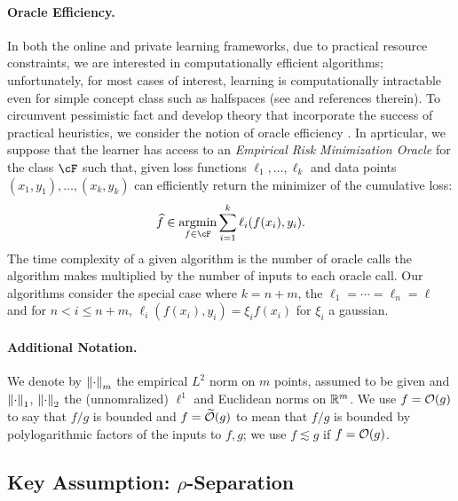 \paragraph{Oracle Efficiency.}
    In both the online and private learning frameworks, due to practical resource constraints, we are interested in computationally efficient algorithms; unfortunately, for most cases of interest, learning is computationally intractable even for simple concept class such as halfspaces (see \citep{tiegel2022hardness} and references therein).
    To circumvent pessimistic fact and  develop theory that incorporate the success of practical heuristics, we consider the notion of oracle efficiency \citep{kalai2005efficient}.  In aprticular, we suppose that the learner has access to an \emph{Empirical Risk Minimization Oracle} for the class $\cF$ such that, given loss functions $\ell_1, \dots, \ell_k$ and data points $(x_1, y_1), \dots, (x_k, y_k)$ can efficiently return the minimizer of the cumulative loss:
    \begin{align}
        \fhat \in \argmin_{f \in \cF} \sum_{ i = 1}^k \ell_i(f(x_i), y_i).
    \end{align}
    The time complexity of a given algorithm is the number of oracle calls the algorithm makes multiplied by the number of inputs to each oracle call.  Our algorithms consider the special case where $k = n + m$, the $\ell_1 = \cdots = \ell_n = \ell$ and for $n < i \leq n + m$, $\ell_i(f(x_i), y_i) = \xi_i f(x_i)$ for $\xi_i$ a  gaussian. 


\paragraph{Additional Notation.}  We denote by $\left\|\cdot\right\|_m$ the empirical $L^2$ norm on $m$ points, assumed to be given and $\left\|\cdot\right\|_1$, $\left\|\cdot\right\|_2$ the (unnomralized) $\ell^1$ and Euclidean norms on $\mathbb{R}^m$.  We use $f = \mathcal{O}(g)$ to say that $f/g$ is bounded and $f = \widetilde{\mathcal{O}}(g) $ to mean that $f/g$ is bounded by polylogarithmic factors of the inputs to $f,g$; we use $f \lesssim g$ if $f = \mathcal{O}(g)$.















\subsection{Key Assumption: $\rho$-Separation}


